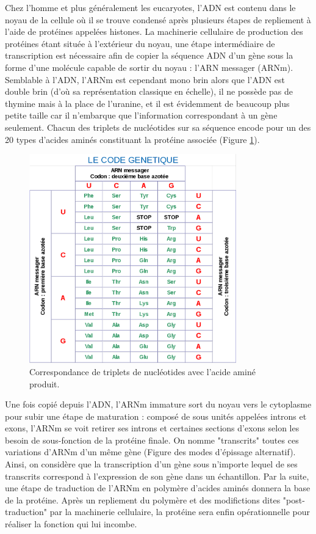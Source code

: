 Chez l'homme et plus généralement les eucaryotes, l'ADN est contenu dans le noyau de la cellule où il se trouve condensé après plusieurs étapes de repliement à l'aide de protéines appelées histones. La machinerie cellulaire de production des protéines étant située à l'extérieur du noyau, une étape intermédiaire de transcription est nécessaire afin de copier la séquence ADN d'un gène sous la forme d'une molécule capable de sortir du noyau : l'ARN messager (ARNm). Semblable à l'ADN, l'ARNm est cependant mono brin alors que l'ADN est double brin (d'où sa représentation classique en échelle), il ne possède pas de thymine mais à la place de l'uranine, et il est évidemment de beaucoup plus petite taille car il n'embarque que l'information correspondant à un gène seulement. Chacun des triplets de nucléotides sur sa séquence encode pour un des 20 types d'acides aminés constituant la protéine associée (Figure \ref{fig:intro_code_genetique}).

\begin{figure}[!ht]
    \centering
    \includegraphics[width=0.8\textwidth]{img/intro/code_genetique.png}
    \caption{Correspondance de triplets de nucléotides avec l'acide aminé produit.}
    \label{fig:intro_code_genetique}
\end{figure}


Une fois copié depuis l'ADN, l'ARNm immature sort du noyau vers le cytoplasme pour subir une étape de maturation : composé de sous unités appelées introns et exons, l'ARNm se voit retirer ses introns et certaines sections d'exons selon les besoin de sous-fonction de la protéine finale. On nomme "transcrits" toutes ces variations d'ARNm d'un même gène (Figure des modes d'épissage alternatif). Ainsi, on considère que la transcription d'un gène sous n'importe lequel de ses transcrits correspond à l'expression de son gène dans un échantillon. Par la suite, une étape de traduction de l'ARNm en polymère d'acides aminés donnera la base de la protéine. Après un repliement du polymère et des modifictions dites "post-traduction" par la machinerie cellulaire, la protéine sera enfin opérationnelle pour réaliser la fonction qui lui incombe. 


